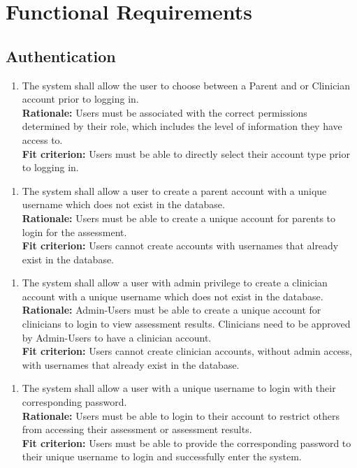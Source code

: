 \documentclass[12pt]{article}
\begin{document}
\section{Functional Requirements}

\subsection{Authentication}
\begin{enumerate}[{FR-A}1. ]
  \item The system shall allow the user to choose between a Parent and  or Clinician account prior to logging in.\\
  \textbf{Rationale: }Users must be associated with the correct permissions determined by their role, which includes the level of information they have access to.\\
  \textbf{Fit criterion: }Users must be able to directly select their account type prior to logging in. 
\end{enumerate}
\begin{enumerate}[{FR-A}2. ]
  \item The system shall allow a user to create a parent account with a unique username which does not exist in the database.\\
  \textbf{Rationale: }Users must be able to create a unique account for parents to login for the assessment.\\
  \textbf{Fit criterion: }Users cannot create accounts with usernames that already exist in the database.
\end{enumerate}
\begin{enumerate}[{FR-A}3. ]
  \item The system shall allow a user with admin privilege to create a clinician account with a unique username which does not exist in the database.\\
  \textbf{Rationale: }Admin-Users must be able to create a unique account for clinicians to login to view assessment results. Clinicians need to be approved by Admin-Users to have a clinician account.\\
  \textbf{Fit criterion: }Users cannot create clinician accounts, without admin access, with usernames that already exist in the database. 
\end{enumerate}
\begin{enumerate}[{FR-A}4. ]
  \item The system shall allow a user with a unique username to login with their corresponding password.\\
  \textbf{Rationale: }Users must be able to login to their account to restrict others from accessing their assessment or assessment results.\\
  \textbf{Fit criterion: }Users must be able to provide the corresponding password to their unique username to login and successfully enter the system. 
\end{enumerate}
\end{document}
